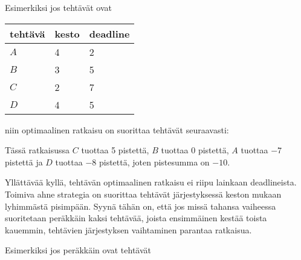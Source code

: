 Esimerkiksi jos tehtävät ovat

\begin{center}
\begin{tabular}{lll}
tehtävä & kesto & deadline \\
\hline
$A$ & 4 & 2 \\
$B$ & 3 & 5 \\
$C$ & 2 & 7 \\
$D$ & 4 & 5 \\
\end{tabular}
\end{center}

\noindent
niin optimaalinen ratkaisu on suorittaa
tehtävät seuraavasti:

\begin{center}
\end{center}

Tässä ratkaisussa $C$ tuottaa 5 pistettä,
$B$ tuottaa 0 pistettä, $A$ tuottaa $-7$ pistettä
ja $D$ tuottaa $-8$ pistettä,
joten pistesumma on $-10$.

Yllättävää kyllä, tehtävän optimaalinen ratkaisu
ei riipu lainkaan deadlineista.
Toimiva ahne strategia on
suorittaa tehtävät järjestyksessä keston mukaan
lyhimmästä pisimpään.
Syynä tähän on, että jos missä tahansa vaiheessa
suoritetaan peräkkäin kaksi tehtävää,
joista ensimmäinen kestää toista kauemmin,
tehtävien järjestyksen vaihtaminen parantaa ratkaisua.

Esimerkiksi jos peräkkäin ovat tehtävät

\begin{center}
\end{center}

